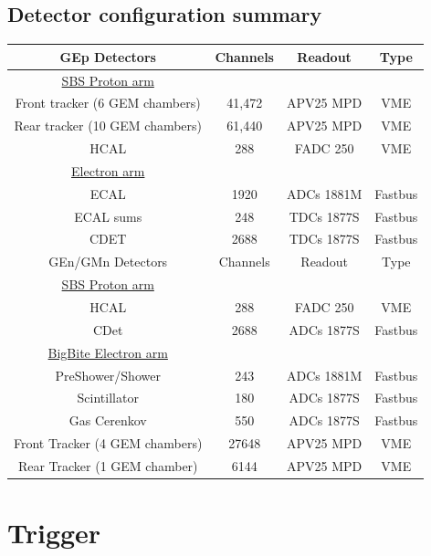 \documentclass{article}
\begin{document}
\subsection{Detector configuration summary}
\begin{tabular}{|c|c|c|c|}
\hline
GEp Detectors & Channels& Readout & Type \\
\hline
\underline{SBS Proton arm} & & & \\
Front tracker (6 GEM chambers) & 41,472 & APV25 MPD& VME\\
Rear tracker (10 GEM chambers) & 61,440& APV25 MPD& VME\\
HCAL & 288 & FADC 250 &VME\\
\hline
\underline{Electron arm} & & & \\
ECAL & 1920 & ADCs 1881M &Fastbus\\
ECAL sums& 248 & TDCs 1877S &Fastbus\\
CDET & 2688 & TDCs 1877S &Fastbus \\
\hline
\hline
GEn/GMn Detectors & Channels& Readout & Type \\
\hline
\underline{SBS Proton arm} & & & \\
HCAL & 288 & FADC 250 &VME\\
CDet & 2688 & ADCs 1877S&Fastbus\\
\hline
\underline{BigBite Electron arm} & & & \\
PreShower/Shower & 243 & ADCs 1881M&Fastbus\\
Scintillator & 180& ADCs 1877S&Fastbus\\
Gas Cerenkov & 550& ADCs 1877S&Fastbus\\
Front Tracker (4 GEM chambers) & 27648 & APV25 MPD &VME\\
Rear Tracker (1 GEM chamber) & 6144& APV25 MPD &VME\\
\hline
\end{tabular}

\section{Trigger}
\end{document}
